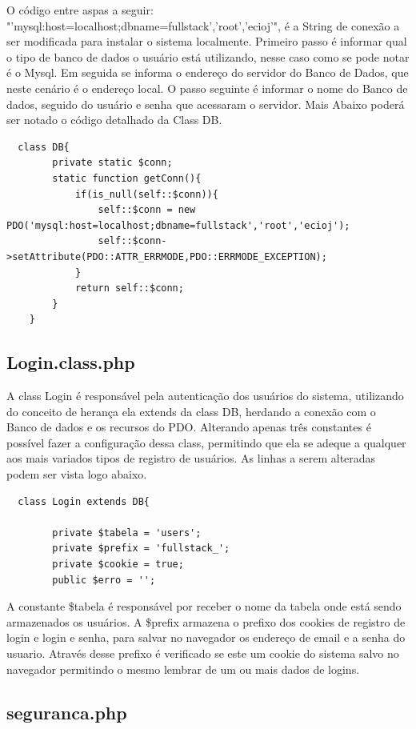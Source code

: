 \documentclass[
	article,			%
	11pt,				%
	oneside,			%
	a4paper,			%
	english,			%
	brazil,				%
	sumario=tradicional
	]{abntex2}
\begin{document}
O código entre aspas a seguir: "'mysql:host=localhost;dbname=fullstack','root','ecioj’", é a String de conexão a ser modificada para instalar o sistema localmente. Primeiro passo é informar qual o tipo de banco de dados o usuário está utilizando, nesse caso como se pode notar é o Mysql. Em seguida se informa o endereço do servidor do Banco de Dados, que neste cenário é o endereço local.  O passo seguinte é informar o nome do Banco de dados, seguido do usuário e senha que acessaram o servidor.  Mais Abaixo poderá ser notado o código detalhado da Class DB.  

\begin{verbatim}
  class DB{
		private static $conn;
		static function getConn(){
			if(is_null(self::$conn)){
				self::$conn = new PDO('mysql:host=localhost;dbname=fullstack','root','ecioj');
				self::$conn->setAttribute(PDO::ATTR_ERRMODE,PDO::ERRMODE_EXCEPTION);
			}
			return self::$conn;
		}
	}
\end{verbatim}

\subsection{Login.class.php}

A class Login é responsável pela autenticação  dos usuários do sistema, utilizando do conceito de herança ela extends da class DB, herdando a conexão com o Banco de dados e os recursos do PDO. Alterando apenas três constantes é possível fazer a configuração dessa class, permitindo que ela se adeque a qualquer aos mais variados tipos de registro de usuários. As linhas a serem alteradas podem ser vista logo abaixo. 

\begin{verbatim}
  class Login extends DB{
		
		private $tabela = 'users';
		private $prefix = 'fullstack_';
		private $cookie = true;
		public $erro = '';
\end{verbatim}

A constante  \$tabela  é responsável por receber o nome da tabela onde está sendo armazenados os usuários. A \$prefix armazena o prefixo dos cookies de registro de login e login e senha, para salvar no navegador os endereço de email e a senha do usuario. Através desse prefixo é verificado se este um cookie do sistema salvo no navegador permitindo o mesmo lembrar de um ou mais dados de logins.   


\subsection{seguranca.php}
\end{document}
